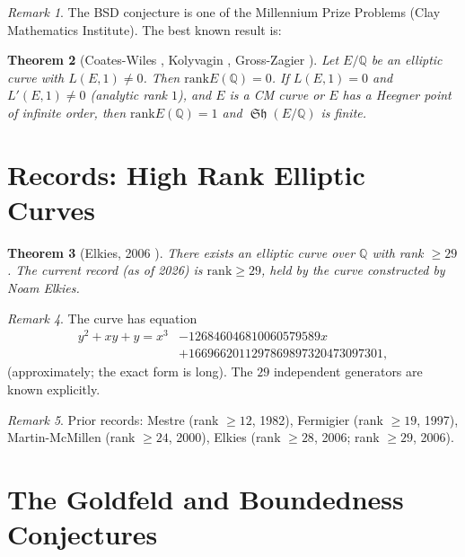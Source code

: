 \documentclass[12pt,a4paper]{amsart}
\newtheorem{theorem}{Theorem}[section]
\theoremstyle{definition}
\theoremstyle{remark}
\newtheorem{remark}[theorem]{Remark}
\newcommand{\Q}{\mathbb{Q}}
\DeclareMathOperator{\Sha}{\mathfrak{Sh}}
\newcommand{\rank}{\mathrm{rank}}
\begin{document}
\begin{remark}
  The BSD conjecture is one of the Millennium Prize Problems (Clay Mathematics Institute).
  The best known result is:
\end{remark}

\begin{theorem}[Coates-Wiles \cite{CW1977}, Kolyvagin \cite{Kolyvagin1988},
  Gross-Zagier \cite{GZ1986}]
  Let $E/\Q$ be an elliptic curve with $L(E,1) \neq 0$. Then $\rank E(\Q) = 0$.
  If $L(E,1) = 0$ and $L'(E,1) \neq 0$ (analytic rank $1$), and $E$ is a CM curve or
  $E$ has a Heegner point of infinite order, then $\rank E(\Q) = 1$ and $\Sha(E/\Q)$
  is finite.
\end{theorem}

\section{Records: High Rank Elliptic Curves}\label{sec:records}

\begin{theorem}[Elkies, 2006 \cite{Elkies2006}]
  There exists an elliptic curve over $\Q$ with rank $\geq 29$.
  The current record (as of 2026) is $\rank \geq 29$, held by the curve constructed by
  Noam Elkies.
\end{theorem}

\begin{remark}
  The curve has equation
  \begin{align*}
    y^2 + xy + y = x^3 &- 126846046810060579589x \\
                        &+ 1669662011297869897320473097301,
  \end{align*}
  (approximately; the exact form is long). The $29$ independent generators are known
  explicitly.
\end{remark}

\begin{remark}
  Prior records: Mestre \cite{Mestre1982} (rank $\geq 12$, 1982),
  Fermigier (rank $\geq 19$, 1997),
  Martin-McMillen (rank $\geq 24$, 2000),
  Elkies (rank $\geq 28$, 2006; rank $\geq 29$, 2006).
\end{remark}

\section{The Goldfeld and Boundedness Conjectures}\label{sec:goldfeld}
\end{document}
